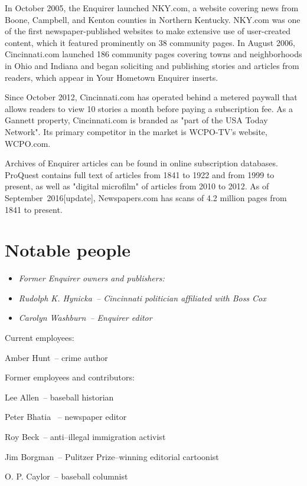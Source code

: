 In October 2005, the Enquirer launched NKY.com, a website covering news
from Boone, Campbell, and Kenton counties in Northern Kentucky. NKY.com
was one of the first newspaper-published websites to make extensive use
of user-created content, which it featured prominently on 38 community
pages. In August 2006, Cincinnati.com launched 186 community pages
covering towns and neighborhoods in Ohio and Indiana and began
soliciting and publishing stories and articles from readers, which
appear in Your Hometown Enquirer inserts.

Since October 2012, Cincinnati.com has operated behind a metered paywall
that allows readers to view 10 stories a month before paying a
subscription fee. As a Gannett property, Cincinnati.com is branded as
"part of the USA Today Network". Its primary competitor in the market is
WCPO-TV's website, WCPO.com.

Archives of Enquirer articles can be found in online subscription
databases. ProQuest contains full text of articles from 1841 to 1922 and
from 1999 to present, as well as "digital microfilm" of articles from
2010 to 2012. As of September~2016{[}update{]}, Newspapers.com has scans
of 4.2 million pages from 1841 to present.

\section{Notable people}\label{notable-people}

\begin{itemize}
\item
  \emph{Former Enquirer owners and publishers:}
\item
  \emph{Rudolph K. Hynicka~-- Cincinnati politician affiliated with Boss
  Cox}
\item
  \emph{Carolyn Washburn~-- Enquirer editor}
\end{itemize}

Current employees:

Amber Hunt~-- crime author

Former employees and contributors:

Lee Allen~-- baseball historian

Peter Bhatia ~-- newspaper editor

Roy Beck~-- anti--illegal immigration activist

Jim Borgman~-- Pulitzer Prize--winning editorial cartoonist

O. P. Caylor~-- baseball columnist

